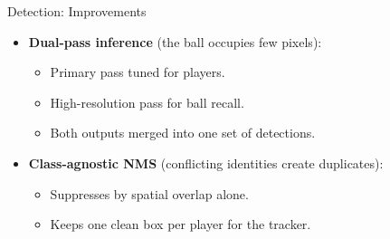 \begin{frame}{Detection: Improvements}
\begin{itemize}
  \item \textbf{Dual-pass inference} (the ball occupies few pixels):
  \begin{itemize}
    \item Primary pass tuned for players.
    \item High-resolution pass for ball recall.
    \item Both outputs merged into one set of detections.
  \end{itemize}
  \item \textbf{Class-agnostic NMS} \cite{nms} (conflicting identities create duplicates):
  \begin{itemize}
    \item Suppresses by spatial overlap alone.
    \item Keeps one clean box per player for the tracker.
  \end{itemize}
\end{itemize}
\end{frame}
